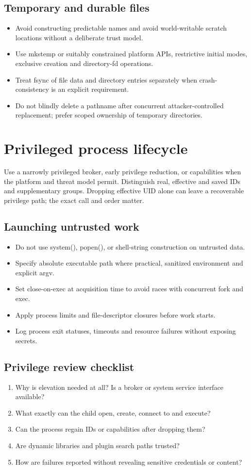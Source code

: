 \documentclass[11pt,letterpaper,oneside]{report}
\begin{document}
\section{Temporary and durable files}
\begin{itemize}
\item Avoid constructing predictable names and avoid world-writable scratch locations without a deliberate trust model.
\item Use mkstemp or suitably constrained platform APIs, restrictive initial modes, exclusive creation and directory-fd operations.
\item Treat fsync of file data and directory entries separately when crash-consistency is an explicit requirement.
\item Do not blindly delete a pathname after concurrent attacker-controlled replacement; prefer scoped ownership of temporary directories.
\end{itemize}
\chapter{Privileged process lifecycle}
Use a narrowly privileged broker, early privilege reduction, or capabilities when the platform and threat model permit. Distinguish real, effective and saved IDs and supplementary groups. Dropping effective UID alone can leave a recoverable privilege path; the exact call and order matter.

\section{Launching untrusted work}
\begin{itemize}
\item Do not use system(), popen(), or shell-string construction on untrusted data.
\item Specify absolute executable path where practical, sanitized environment and explicit argv.
\item Set close-on-exec at acquisition time to avoid races with concurrent fork and exec.
\item Apply process limits and file-descriptor closures before work starts.
\item Log process exit statuses, timeouts and resource failures without exposing secrets.
\end{itemize}
\section{Privilege review checklist}
\begin{enumerate}
\item Why is elevation needed at all? Is a broker or system service interface available?
\item What exactly can the child open, create, connect to and execute?
\item Can the process regain IDs or capabilities after dropping them?
\item Are dynamic libraries and plugin search paths trusted?
\item How are failures reported without revealing sensitive credentials or content?
\end{enumerate}
\end{document}
